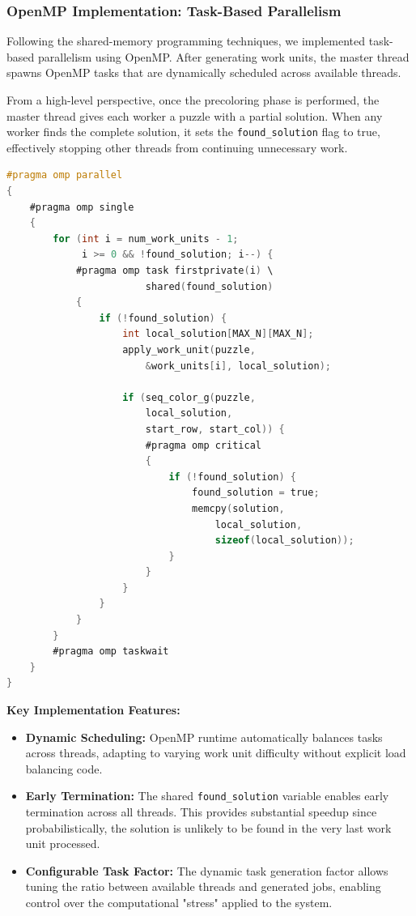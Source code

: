 \begin{enumerate}
\subsubsection{OpenMP Implementation: Task-Based Parallelism}
\label{subsubsec:omp_implementation}
Following the shared-memory programming techniques, we implemented task-based parallelism using OpenMP. After generating work units, the master thread spawns OpenMP tasks that are dynamically scheduled across available threads.

From a high-level perspective, once the precoloring phase is performed, the master thread gives each worker a puzzle with a partial solution. When any worker finds the complete solution, it sets the \texttt{found\_solution} flag to true, effectively stopping other threads from continuing unnecessary work.

\begin{lstlisting}[language=C, caption=OpenMP task-based implementation, label={listing:omp_implementation}]
#pragma omp parallel
{
    #pragma omp single
    {
        for (int i = num_work_units - 1; 
             i >= 0 && !found_solution; i--) {
            #pragma omp task firstprivate(i) \
                        shared(found_solution)
            {
                if (!found_solution) {
                    int local_solution[MAX_N][MAX_N];
                    apply_work_unit(puzzle, 
                        &work_units[i], local_solution);
                    
                    if (seq_color_g(puzzle, 
                        local_solution, 
                        start_row, start_col)) {
                        #pragma omp critical
                        {
                            if (!found_solution) {
                                found_solution = true;
                                memcpy(solution, 
                                    local_solution, 
                                    sizeof(local_solution));
                            }
                        }
                    }
                }
            }
        }
        #pragma omp taskwait
    }
}
\end{lstlisting}

\textbf{Key Implementation Features:}
\begin{itemize}
    \item \textbf{Dynamic Scheduling:} OpenMP runtime automatically balances tasks across threads, adapting to varying work unit difficulty without explicit load balancing code.
    \item \textbf{Early Termination:} The shared \texttt{found\_solution} variable enables early termination across all threads. This provides substantial speedup since probabilistically, the solution is unlikely to be found in the very last work unit processed.
    \item \textbf{Configurable Task Factor:} The dynamic task generation factor allows tuning the ratio between available threads and generated jobs, enabling control over the computational "stress" applied to the system.
\end{itemize}


\end{enumerate}
